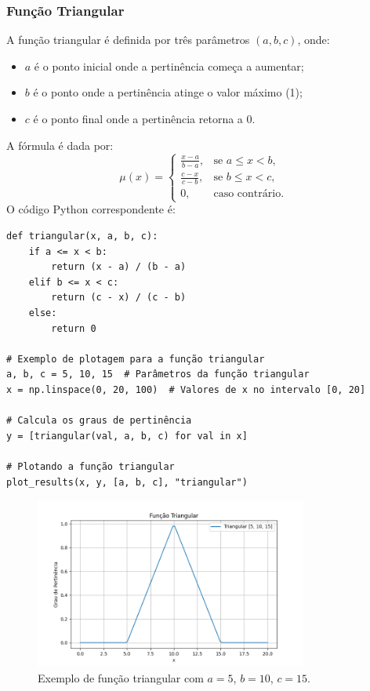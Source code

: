 \documentclass[a4paper,12pt]{article}
\begin{document}
\subsubsection{Função Triangular}
A função triangular é definida por três parâmetros $(a, b, c)$, onde:
\begin{itemize}
    \item $a$ é o ponto inicial onde a pertinência começa a aumentar;
    \item $b$ é o ponto onde a pertinência atinge o valor máximo (1);
    \item $c$ é o ponto final onde a pertinência retorna a 0.
\end{itemize}
A fórmula é dada por:
\[
\mu(x) =
\begin{cases}
\frac{x - a}{b - a}, & \text{se } a \leq x < b, \\
\frac{c - x}{c - b}, & \text{se } b \leq x < c, \\
0, & \text{caso contrário.}
\end{cases}
\]
O código Python correspondente é:
\begin{verbatim}
def triangular(x, a, b, c):
    if a <= x < b:
        return (x - a) / (b - a)
    elif b <= x < c:
        return (c - x) / (c - b)
    else:
        return 0

# Exemplo de plotagem para a função triangular
a, b, c = 5, 10, 15  # Parâmetros da função triangular
x = np.linspace(0, 20, 100)  # Valores de x no intervalo [0, 20]

# Calcula os graus de pertinência
y = [triangular(val, a, b, c) for val in x]

# Plotando a função triangular
plot_results(x, y, [a, b, c], "triangular")

\end{verbatim}

\begin{figure}[H]
    \centering
    \includegraphics[width=0.8\textwidth]{img/triangular.png}
    \caption{Exemplo de função triangular com $a=5$, $b=10$, $c=15$.}
\end{figure}
\end{document}

